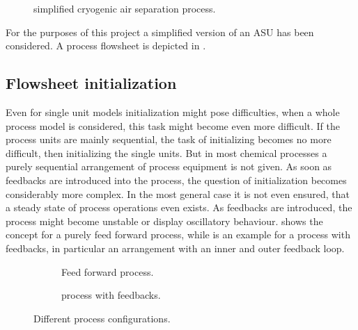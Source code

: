     \begin{figure}
        \centering
        
        \caption{simplified cryogenic air separation process.}
        \label{fig:ASU_simple_coco}
    \end{figure}

    For the purposes of this project a simplified version of an ASU has been considered. A process flowsheet is depicted
    in .

    \subsection{Flowsheet initialization}
        Even for single unit models initialization might pose difficulties, when a whole process model is considered,
        this task might become even more difficult. If the process units are mainly sequential, the task of initializing
        becomes no more difficult, then initializing the single units. But in most chemical processes a purely sequential
        arrangement of process equipment is not given. As soon as feedbacks are introduced into the process, the question
        of initialization becomes considerably more complex. In the most general case it is not even ensured, that a steady
        state of process operations even exists. As feedbacks are introduced, the process might become unstable or display
        oscillatory behaviour.  shows the concept for a purely feed forward process, while
         is an example for a process with feedbacks, in particular an arrangement with an inner
        and outer feedback loop.

        \begin{figure}
            \centering
            \begin{subfigure}{0.4\textwidth}
                
                \caption{Feed forward process.}
                \label{fig:foreward_process}
            \end{subfigure}
            \hspace{0.05\textwidth}
            \begin{subfigure}{0.4\textwidth}
                
                \caption{process with feedbacks.}
                \label{fig:feedback_process}
            \end{subfigure}
            \caption{Different process configurations.}
        \end{figure}

